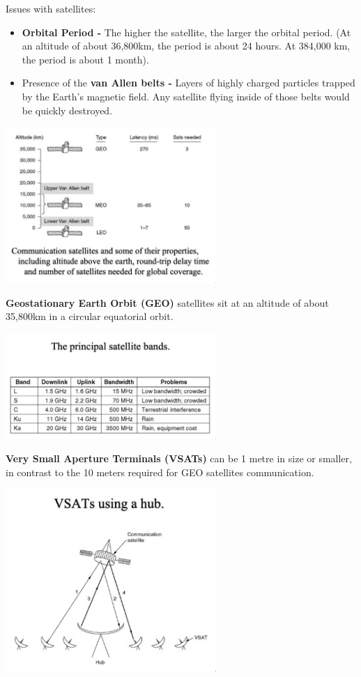 \documentclass[11pt]{article}
\begin{document}
Issues with satellites:
\begin{itemize}
    \item   \textbf{Orbital Period -} The higher the satellite, the larger the orbital period. 
            (At an altitude of about 36,800km, the period is about 24 hours. At 384,000 km, the period is about 1 month). 
    \item   Presence of the \textbf{van Allen belts -} Layers of highly charged particles trapped by the Earth's magnetic field. 
            Any satellite flying inside of those belts would be quickly destroyed. 
\end{itemize}

\begin{center}
    \includegraphics[width=0.6\textwidth]{comsat1.png}
\end{center}

\textbf{Geostationary Earth Orbit (GEO)} satellites sit at an altitude of about 35,800km in a circular equatorial orbit. 

\begin{center}
    \includegraphics[width=0.6\textwidth]{comsat2.png}
\end{center}

\textbf{Very Small Aperture Terminals (VSATs)}  can be 1 metre in size or smaller, in contrast to the 10 meters required for 
GEO satellites communication. 

\begin{center}
    \includegraphics[width=0.6\textwidth]{vsathub.png}
\end{center}
\end{document}
